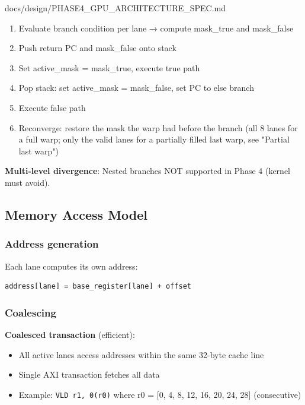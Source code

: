 \begin{relocated}{docs/design/PHASE4_GPU_ARCHITECTURE_SPEC.md}
\begin{enumerate}
\def\labelenumi{\arabic{enumi}.}
\tightlist
\item
  Evaluate branch condition per lane → compute mask\_true and
  mask\_\allowbreak{}false
\item
  Push return PC and mask\_\allowbreak{}false onto stack
\item
  Set active\_\allowbreak{}mask = mask\_\allowbreak{}true, execute true
  path
\item
  Pop stack: set active\_\allowbreak{}mask = mask\_\allowbreak{}false,
  set PC to else branch
\item
  Execute false path
\item
  Reconverge: restore the mask the warp had before the branch (all 8
  lanes for a full warp; only the valid lanes for a partially filled
  last warp, see "Partial last warp")
\end{enumerate}

\textbf{Multi-level divergence}: Nested branches NOT supported in Phase
4 (kernel must avoid).

\subsection{Memory Access Model}\label{ds:ch:phase4-gpu-architecture:memory-access-model}

\subsubsection{Address generation}\label{ds:ch:phase4-gpu-architecture:address-generation}

Each lane computes its own address:

\begin{lstlisting}[language={}]
address[lane] = base_register[lane] + offset
\end{lstlisting}

\subsubsection{Coalescing}\label{ds:ch:phase4-gpu-architecture:coalescing}

\textbf{Coalesced transaction} (efficient):

\begin{itemize}
\tightlist
\item
  All active lanes access addresses within the same 32-byte cache line
\item
  Single AXI transaction fetches all data
\item
  Example: \texttt{VLD\ r1,\allowbreak{}\ 0(r0)} where r0 = {[}0, 4, 8,
  12, 16, 20, 24, 28{]} (consecutive)
\end{itemize}


\end{relocated}
